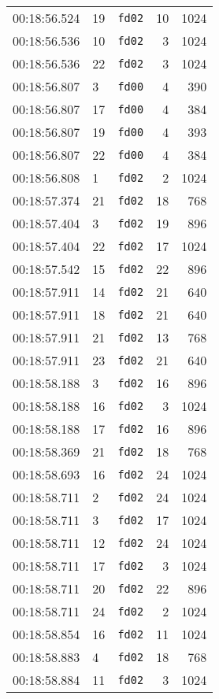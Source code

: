 \documentclass{article}
\begin{document}
\begin{longtable}{lllrr}
00:18:56.524 & 19 & \texttt{fd02} & 10 & 1024 \\
00:18:56.536 & 10 & \texttt{fd02} & 3 & 1024 \\
00:18:56.536 & 22 & \texttt{fd02} & 3 & 1024 \\
00:18:56.807 & 3 & \texttt{fd00} & 4 & 390 \\
00:18:56.807 & 17 & \texttt{fd00} & 4 & 384 \\
00:18:56.807 & 19 & \texttt{fd00} & 4 & 393 \\
00:18:56.807 & 22 & \texttt{fd00} & 4 & 384 \\
00:18:56.808 & 1 & \texttt{fd02} & 2 & 1024 \\
00:18:57.374 & 21 & \texttt{fd02} & 18 & 768 \\
00:18:57.404 & 3 & \texttt{fd02} & 19 & 896 \\
00:18:57.404 & 22 & \texttt{fd02} & 17 & 1024 \\
00:18:57.542 & 15 & \texttt{fd02} & 22 & 896 \\
00:18:57.911 & 14 & \texttt{fd02} & 21 & 640 \\
00:18:57.911 & 18 & \texttt{fd02} & 21 & 640 \\
00:18:57.911 & 21 & \texttt{fd02} & 13 & 768 \\
00:18:57.911 & 23 & \texttt{fd02} & 21 & 640 \\
00:18:58.188 & 3 & \texttt{fd02} & 16 & 896 \\
00:18:58.188 & 16 & \texttt{fd02} & 3 & 1024 \\
00:18:58.188 & 17 & \texttt{fd02} & 16 & 896 \\
00:18:58.369 & 21 & \texttt{fd02} & 18 & 768 \\
00:18:58.693 & 16 & \texttt{fd02} & 24 & 1024 \\
00:18:58.711 & 2 & \texttt{fd02} & 24 & 1024 \\
00:18:58.711 & 3 & \texttt{fd02} & 17 & 1024 \\
00:18:58.711 & 12 & \texttt{fd02} & 24 & 1024 \\
00:18:58.711 & 17 & \texttt{fd02} & 3 & 1024 \\
00:18:58.711 & 20 & \texttt{fd02} & 22 & 896 \\
00:18:58.711 & 24 & \texttt{fd02} & 2 & 1024 \\
00:18:58.854 & 16 & \texttt{fd02} & 11 & 1024 \\
00:18:58.883 & 4 & \texttt{fd02} & 18 & 768 \\
00:18:58.884 & 11 & \texttt{fd02} & 3 & 1024 \\

\end{longtable}
\end{document}
